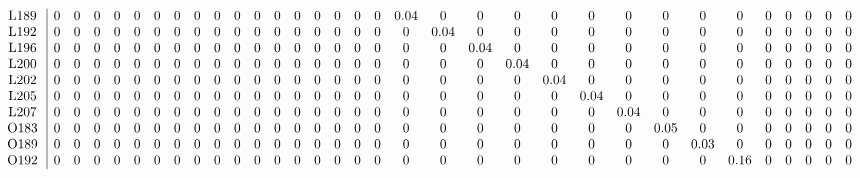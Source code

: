 \begin{table}[H]
\begin{center}
\begin{math}
\begin{array}{c|cccccccccccccccccccccccccccccccc}
\mathrm{L189} \hspace*{2pt} &  0 &  0 &  0 &  0 &  0 &  0 &  0 &  0 &  0 &  0 &  0 &  0 &  0 &  0 &  0 &  0 &  0 &       0.04 &  0 &  0 &  0 &  0 &  0 &  0 &  0 &  0 &  0 &  0 &  0 &  0 &  0 &  0 \\
\mathrm{L192} \hspace*{2pt} &  0 &  0 &  0 &  0 &  0 &  0 &  0 &  0 &  0 &  0 &  0 &  0 &  0 &  0 &  0 &  0 &  0 &  0 &       0.04 &  0 &  0 &  0 &  0 &  0 &  0 &  0 &  0 &  0 &  0 &  0 &  0 &  0 \\
\mathrm{L196} \hspace*{2pt} &  0 &  0 &  0 &  0 &  0 &  0 &  0 &  0 &  0 &  0 &  0 &  0 &  0 &  0 &  0 &  0 &  0 &  0 &  0 &       0.04 &  0 &  0 &  0 &  0 &  0 &  0 &  0 &  0 &  0 &  0 &  0 &  0 \\
\mathrm{L200} \hspace*{2pt} &  0 &  0 &  0 &  0 &  0 &  0 &  0 &  0 &  0 &  0 &  0 &  0 &  0 &  0 &  0 &  0 &  0 &  0 &  0 &  0 &       0.04 &  0 &  0 &  0 &  0 &  0 &  0 &  0 &  0 &  0 &  0 &  0 \\
\mathrm{L202} \hspace*{2pt} &  0 &  0 &  0 &  0 &  0 &  0 &  0 &  0 &  0 &  0 &  0 &  0 &  0 &  0 &  0 &  0 &  0 &  0 &  0 &  0 &  0 &       0.04 &  0 &  0 &  0 &  0 &  0 &  0 &  0 &  0 &  0 &  0 \\
\mathrm{L205} \hspace*{2pt} &  0 &  0 &  0 &  0 &  0 &  0 &  0 &  0 &  0 &  0 &  0 &  0 &  0 &  0 &  0 &  0 &  0 &  0 &  0 &  0 &  0 &  0 &       0.04 &  0 &  0 &  0 &  0 &  0 &  0 &  0 &  0 &  0 \\
\mathrm{L207} \hspace*{2pt} &  0 &  0 &  0 &  0 &  0 &  0 &  0 &  0 &  0 &  0 &  0 &  0 &  0 &  0 &  0 &  0 &  0 &  0 &  0 &  0 &  0 &  0 &  0 &       0.04 &  0 &  0 &  0 &  0 &  0 &  0 &  0 &  0 \\
\mathrm{O183} \hspace*{2pt} &  0 &  0 &  0 &  0 &  0 &  0 &  0 &  0 &  0 &  0 &  0 &  0 &  0 &  0 &  0 &  0 &  0 &  0 &  0 &  0 &  0 &  0 &  0 &  0 &       0.05 &  0 &  0 &  0 &  0 &  0 &  0 &  0 \\
\mathrm{O189} \hspace*{2pt} &  0 &  0 &  0 &  0 &  0 &  0 &  0 &  0 &  0 &  0 &  0 &  0 &  0 &  0 &  0 &  0 &  0 &  0 &  0 &  0 &  0 &  0 &  0 &  0 &  0 &       0.03 &  0 &  0 &  0 &  0 &  0 &  0 \\
\mathrm{O192} \hspace*{2pt} &  0 &  0 &  0 &  0 &  0 &  0 &  0 &  0 &  0 &  0 &  0 &  0 &  0 &  0 &  0 &  0 &  0 &  0 &  0 &  0 &  0 &  0 &  0 &  0 &  0 &  0 &       0.16 &  0 &  0 &  0 &  0 &  0 \\

\end{array}
\end{math}
\end{center}
\end{table}
